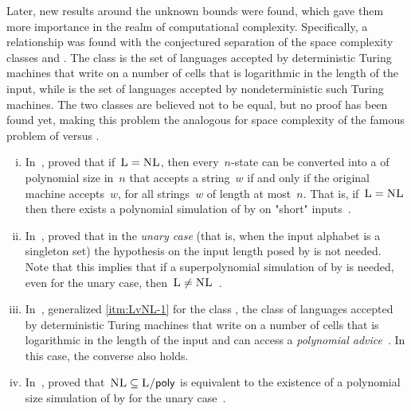 Later, new results around the unknown bounds were found, which gave them more importance in the realm of computational complexity.
Specifically, a relationship was found with the conjectured separation of the space complexity classes \cL and \cNL.
The class \cL is the set of languages accepted by deterministic Turing machines that write on a number of cells that is logarithmic in the length of the input, while \cNL is the set of languages accepted by nondeterministic such Turing machines.
The two classes are believed not to be equal, but no proof has been found yet, making this problem the analogous for space complexity of the famous problem of \cP versus \cNP.
\begin{enumerate}[(i)]
	\item\label{itm:LvNL-1} In~\citeyear{BerLin77}, \citeauthor{BerLin77} proved that if~$\textsc{L}=\textsc{NL}$, then every~$n$-state \TNFA can be converted into a \TDFA of polynomial size in~$n$ that accepts a string~$w$ if and only if the original machine accepts~$w$, for all strings~$w$ of length at most~$n$.
	      That is, if~$\textsc{L}=\textsc{NL}$ then there exists a polynomial simulation of \TNFAs by \TDFAs on "short" inputs~\cite{BerLin77}.
	\item In~\citeyear{GefPig11}, \citeauthor{GefPig11} proved that in the \emph{unary case} (that is, when the input alphabet is a singleton set) the hypothesis on the input length posed by \citeauthor{BerLin77} is not needed.
	      Note that this implies that if a superpolynomial simulation of \TNFAs by \TDFAs is needed, even for the unary case, then~$\textsc{L}\ne\textsc{NL}$~\cite{GefPig11}.
	\item In~\citeyear{Kap14}, \citeauthor{Kap14} generalized \ref{itm:LvNL-1} for the class \cPolyL, the class of languages accepted by deterministic Turing machines that write on a number of cells that is logarithmic in the length of the input and can access a \emph{polynomial advice}~\cite{Kap14,KarLip82}. In this case, the converse also holds.
	\item In~\citeyear{KapPig12}, \citeauthor{KapPig12} proved that~$\textsc{NL}\subseteq\textsc{L/\ensuremath{\mathsf{poly}}}$ is equivalent to the existence of a polynomial size simulation of \TNFAs by \TDFAs for the unary case~\cite{KapPig15}.
\end{enumerate}

